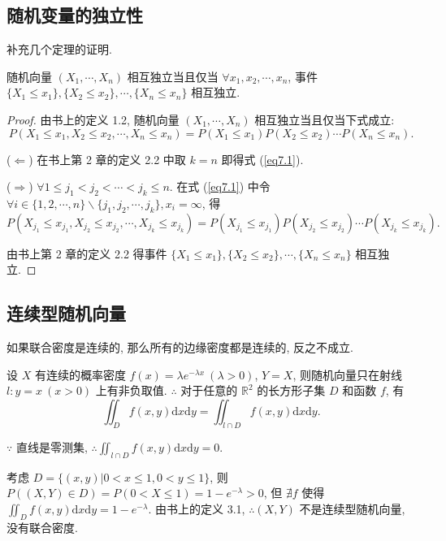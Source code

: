 \documentclass{ctexart}
\begin{document}
\subsection{随机变量的独立性}
补充几个定理的证明.
\begin{theorem}
    随机向量 $(X_1,\cdots,X_n)$ 相互独立当且仅当 $\forall x_1,x_2,\cdots,x_n$, 事件 $\{X_1\leq x_1\},\{X_2\leq x_2\},\cdots,\{X_n\leq x_n\}$ 相互独立.
\end{theorem}
\begin{proof}
    由书上的定义 1.2, 随机向量 $(X_1,\cdots,X_n)$ 相互独立当且仅当下式成立:
    \begin{equation}\label{eq7.1}
        P(X_1\leq x_1,X_2\leq x_2,\cdots,X_n\leq x_n)=P(X_1\leq x_1)P(X_2\leq x_2)\cdots P(X_n\leq x_n).
    \end{equation}

    ($\Leftarrow$) 在书上第 2 章的定义 2.2 中取 $k=n$ 即得式 (\ref{eq7.1}).

    ($\Rightarrow$) $\forall 1\leq j_1<j_2<\cdots<j_k\leq n$. 在式 (\ref{eq7.1}) 中令 $\forall i\in\{1,2,\cdots,n\}\backslash\{j_1,j_2,\cdots,j_k\},x_i=\infty$, 得
     \[P(X_{j_1}\leq x_{j_1},X_{j_2}\leq x_{j_2},\cdots,X_{j_k}\leq x_{j_k})=P(X_{j_1}\leq x_{j_1})P(X_{j_2}\leq x_{j_2})\cdots P(X_{j_k}\leq x_{j_k}).\]

    由书上第 2 章的定义 2.2 得事件 $\{X_1\leq x_1\},\{X_2\leq x_2\},\cdots,\{X_n\leq x_n\}$ 相互独立.
\end{proof}
\subsection{连续型随机向量}
如果联合密度是连续的, 那么所有的边缘密度都是连续的, 反之不成立.
\begin{example}
    设 $X$ 有连续的概率密度 $f(x)=\lambda e^{-\lambda x}\ (\lambda>0)$, $Y=X$, 则随机向量只在射线 $l:y=x\ (x>0)$ 上有非负取值. $\therefore$ 对于任意的 $\mathbb{R}^2$ 的长方形子集 $D$ 和函数 $f$, 有
    \[\iint_Df(x,y)\mathrm{d}x\mathrm{d}y=\iint_{l\cap D}f(x,y)\mathrm{d}x\mathrm{d}y.\]

    $\because$ 直线是零测集, $\therefore\iint_{l\cap D}f(x,y)\mathrm{d}x\mathrm{d}y=0$.

    考虑 $D=\{(x,y)|0<x\leq 1,0<y\leq 1\}$, 则 $P((X,Y)\in D)=P(0<X\leq 1)=1-e^{-\lambda}>0$, 但 $\nexists f$ 使得 $\iint_Df(x,y)\mathrm{d}x\mathrm{d}y=1-e^{-\lambda}$. 由书上的定义 3.1, $\therefore(X,Y)$ 不是连续型随机向量, 没有联合密度.
\end{example}
\end{document}

